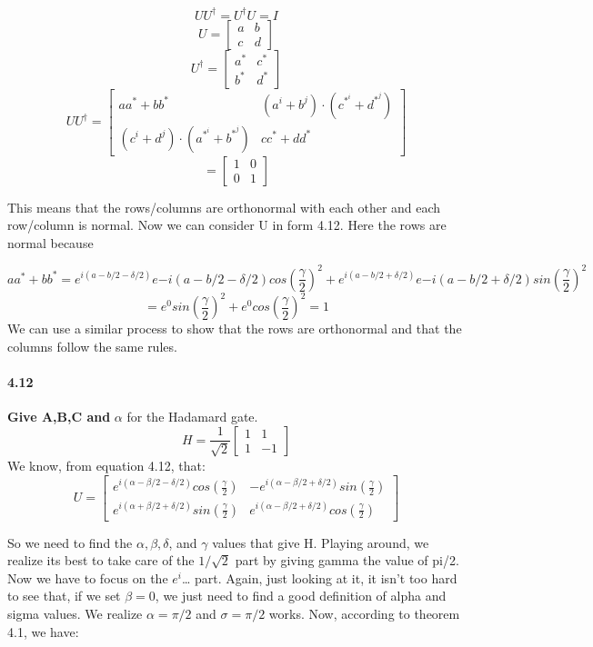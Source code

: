 $$UU^{\dagger} = U^{\dagger}U = I$$
$$ U = \begin{bmatrix}a & b\\c & d \end{bmatrix}$$
$$ U^{\dagger} = \begin{bmatrix}a^* & c^*\\b^* & d^* \end{bmatrix}$$
$$ UU^{\dagger} = \begin{bmatrix} aa^* + bb^* & (a^{i} + b^{j})\cdot (c^{*^{i}} + d^{*^{j}})\\(c^{i} + d^{j})\cdot (a^{*^{i}} + b^{*^{j}}) & cc^* + dd^* \end{bmatrix}$$
$$= \begin{bmatrix}1 & 0\\0 & 1\end{bmatrix}$$


This means that the rows/columns are orthonormal with each other and each row/column is normal. Now we can consider U in form 4.12. Here the rows are normal because  


$$aa^* + bb^* = e^{i(a-b/2-\delta /2)} e{-i(a-b/2-\delta /2)}cos(\frac{\gamma}{2})^2 + e^{i(a-b/2+\delta /2)} e{-i(a-b/2+\delta /2)}sin(\frac{\gamma}{2})^2$$
$$ = e^0 sin(\frac{\gamma}{2})^2 + e^0 cos(\frac{\gamma}{2})^2 = 1$$
We can use a similar process to show that the rows are orthonormal and that the columns follow the same rules.

\paragraph{4.12} \textbf{Give A,B,C and } $\alpha$ for the Hadamard gate.
\\

$$H = \frac{1}{\sqrt{2}}\begin{bmatrix}1 & 1\\1 & -1\end{bmatrix}$$
We know, from equation 4.12, that:
$$U = \begin{bmatrix}e^{i(\alpha-\beta /2 - \delta /2)}cos(\frac{\gamma}{2}) & -e^{i(\alpha-\beta /2 + \delta /2)}sin(\frac{\gamma}{2})\\e^{i(\alpha+\beta /2 + \delta /2)}sin(\frac{\gamma}{2}) & e^{i(\alpha-\beta /2 + \delta /2)}cos(\frac{\gamma}{2})\end{bmatrix}$$


So we need to find the $\alpha,\beta, \delta$, and $\gamma$ values that give H. Playing around, we realize its best to take care of the $1/\sqrt{2}$ part by giving gamma the value of pi/2. Now we have to focus on the $e^i$… part. Again, just looking at it, it isn’t too hard to see that, if we set $\beta = 0$, we just need to find a good definition of alpha and sigma values. We realize $\alpha = \pi/2$ and $\sigma = \pi/2$ works. Now, according to theorem 4.1, we have:

